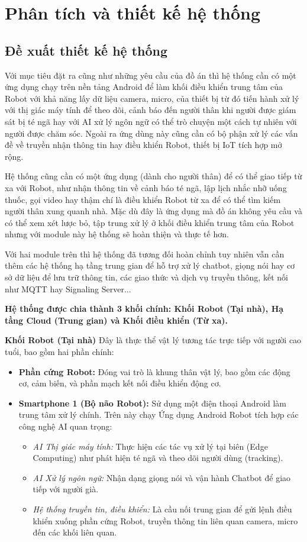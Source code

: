 \section{Phân tích và thiết kế hệ thống}
\subsection{Đề xuất thiết kế hệ thống}
Với mục tiêu đặt ra cũng như những yêu cầu của đồ án thì hệ thống cần có một ứng dụng chạy trên nền tảng Android để làm khối điều khiển trung tâm của Robot với khả năng lấy dữ liệu camera, micro, của thiết bị từ đó tiến hành xử lý với thị giác máy tính để theo dõi, cảnh báo đến người thân khi người được giám sát bị té ngã hay với AI xử lý ngôn ngữ có thể trò chuyện một cách tự nhiên với người được chăm sóc. Ngoài ra ứng dùng này cũng cần có bộ phận xử lý các vấn đề về truyền nhận thông tin hay điều khiển Robot, thiết bị IoT tích hợp mở rộng. 

Hệ thống cũng cần có một ứng dụng (dành cho người thân) để có thể giao tiếp từ xa với Robot, như nhận thông tin về cảnh báo té ngã, lập lịch nhắc nhỡ uống thuốc, gọi video hay thậm chí là điều khiển Robot từ xa để có thể tìm kiếm người thân xung quanh nhà. Mặc dù đây là ứng dụng mà đồ án không yêu cầu và có thể xem xét lược bỏ, tập trung xử lý ở khối điều khiển trung tâm của Robot nhưng với module này hệ thống sẽ hoàn thiện và thực tế hơn.

Với hai module trên thì hệ thống đã tương đối hoàn chỉnh tuy nhiên vẫn cần thêm các hệ thống hạ tầng trung gian để hỗ trợ xử lý chatbot, giọng nói hay cơ sở dữ liệu để lưu trữ thông tin, các giao thức và dịch vụ truyền thông, kết nối như MQTT hay Signaling Server...

\textbf{Hệ thống được chia thành 3 khối chính: Khối Robot (Tại nhà), Hạ tầng Cloud (Trung gian) và Khối điều khiển (Từ xa).}

\textbf{Khối Robot (Tại nhà)}
Đây là thực thể vật lý tương tác trực tiếp với người cao tuổi, bao gồm hai phần chính:
\begin{itemize}
    \item \textbf{Phần cứng Robot:} Đóng vai trò là khung thân vật lý, bao gồm các động cơ, cảm biến, và phần mạch kết nối điều khiển động cơ.
    \item \textbf{Smartphone 1 (Bộ não Robot):} Sử dụng một điện thoại Android làm trung tâm xử lý chính. Trên này chạy Ứng dụng Android Robot tích hợp các công nghệ AI quan trọng:
    \begin{itemize}
        \item \textit{AI Thị giác máy tính:} Thực hiện các tác vụ xử lý tại biên (Edge Computing) như phát hiện té ngã và theo dõi người dùng (tracking).
        \item \textit{AI Xử lý ngôn ngữ:} Nhận dạng giọng nói và vận hành Chatbot để giao tiếp với người già.
        \item \textit{Hệ thống truyền tin, điều khiển:} Là cầu nối trung gian để gửi lệnh điều khiển xuống phần cứng Robot, truyền thông tin liên quan camera, micro đến các khối liên quan.
    \end{itemize}
\end{itemize}

